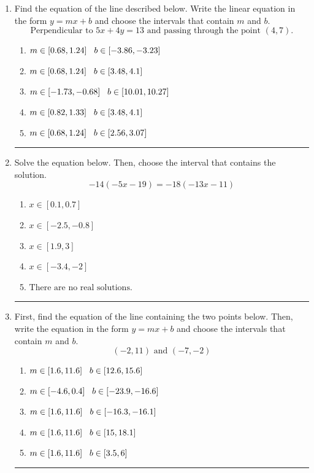 \documentclass[14pt]{extbook}
\newcommand{\litem}[1]{\item#1\hspace*{-1cm}\rule{\textwidth}{0.4pt}}
\begin{document}
\begin{enumerate}
{\begin{enumerate}[label=\Alph*.]
\end{enumerate} }
\litem{
Find the equation of the line described below. Write the linear equation in the form $ y=mx+b $ and choose the intervals that contain $m$ and $b$.\[ \text{Perpendicular to } 5 x + 4 y = 13 \text{ and passing through the point } (4, 7). \]\begin{enumerate}[label=\Alph*.]
\item \( m \in [0.68, 1.24] \hspace*{3mm} b \in [-3.86, -3.23] \)
\item \( m \in [0.68, 1.24] \hspace*{3mm} b \in [3.48, 4.1] \)
\item \( m \in [-1.73, -0.68] \hspace*{3mm} b \in [10.01, 10.27] \)
\item \( m \in [0.82, 1.33] \hspace*{3mm} b \in [3.48, 4.1] \)
\item \( m \in [0.68, 1.24] \hspace*{3mm} b \in [2.56, 3.07] \)

\end{enumerate} }
\litem{
Solve the equation below. Then, choose the interval that contains the solution.\[ -14(-5x -19) = -18(-13x -11) \]\begin{enumerate}[label=\Alph*.]
\item \( x \in [0.1, 0.7] \)
\item \( x \in [-2.5, -0.8] \)
\item \( x \in [1.9, 3] \)
\item \( x \in [-3.4, -2] \)
\item \( \text{There are no real solutions.} \)

\end{enumerate} }
\litem{
First, find the equation of the line containing the two points below. Then, write the equation in the form $ y=mx+b $ and choose the intervals that contain $m$ and $b$.\[ (-2, 11) \text{ and } (-7, -2) \]\begin{enumerate}[label=\Alph*.]
\item \( m \in [1.6, 11.6] \hspace*{3mm} b \in [12.6, 15.6] \)
\item \( m \in [-4.6, 0.4] \hspace*{3mm} b \in [-23.9, -16.6] \)
\item \( m \in [1.6, 11.6] \hspace*{3mm} b \in [-16.3, -16.1] \)
\item \( m \in [1.6, 11.6] \hspace*{3mm} b \in [15, 18.1] \)
\item \( m \in [1.6, 11.6] \hspace*{3mm} b \in [3.5, 6] \)


\end{enumerate}}
\end{enumerate}
\end{document}
